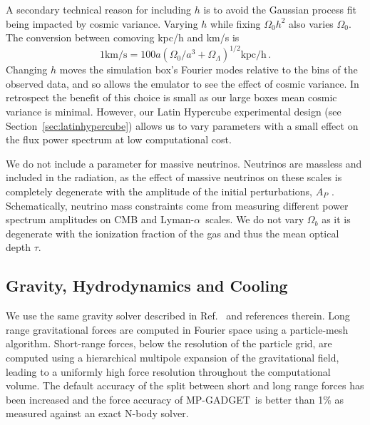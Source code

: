 \documentclass[a4paper,11pt]{article}
\newcommand{\Lya}{Lyman-$\alpha$}
\newcommand{\mpgadget}{{\small MP-GADGET}}
\begin{document}
A secondary technical reason for including $h$ is to avoid the Gaussian process fit being impacted by cosmic variance.
Varying $h$ while fixing $\Omega_0 h^2$ also varies $\Omega_0$. The conversion between comoving kpc/h and km/s is
\begin{equation}
 1 \mathrm{km/s} =  100 a (\Omega_0 /a^3 + \Omega_\Lambda )^{1/2} \mathrm{kpc/h}\,.
\end{equation}
Changing $h$ moves the simulation box's Fourier modes relative to the bins of the observed data, and so allows the emulator to see the effect of cosmic variance. In retrospect the benefit of this choice is small as our large boxes mean cosmic variance is minimal. However, our Latin Hypercube experimental design (see Section~\ref{sec:latinhypercube}) allows us to vary parameters with a small effect on the flux power spectrum at low computational cost.

We do not include a parameter for massive neutrinos. Neutrinos are massless and included in the radiation, as the effect of massive neutrinos on these scales is completely degenerate with the amplitude of the initial perturbations, $A_P$ \cite{Pedersen:2020}.
Schematically, neutrino mass constraints come from measuring different power spectrum amplitudes on CMB and \Lya~scales. We do not vary $\Omega_b$ as it is degenerate with the ionization fraction of the gas and thus the mean optical depth $\tau$.

\subsection{Gravity, Hydrodynamics and Cooling}
\label{sec:gravity}

We use the same gravity solver described in Ref.~\cite{Bird:2022} and references therein. Long range gravitational forces are computed in Fourier space using a particle-mesh algorithm. Short-range forces, below the resolution of the particle grid, are computed using a hierarchical multipole expansion of the gravitational field, leading to a uniformly high force resolution throughout the computational volume. The default accuracy of the split between short and long range forces has been increased and the force accuracy of \mpgadget~is better than 1\% as measured against an exact N-body solver.
\end{document}
